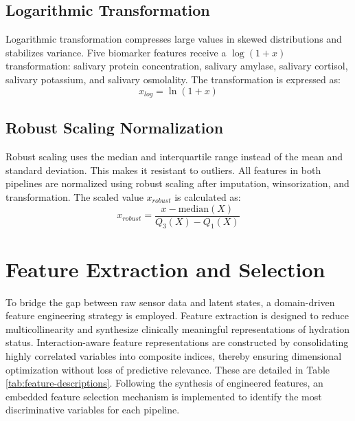\subsection{Logarithmic Transformation}

Logarithmic transformation compresses large values in skewed distributions and stabilizes variance. Five biomarker features receive a $\log(1+x)$ transformation: salivary protein concentration, salivary amylase, salivary cortisol, salivary potassium, and salivary osmolality. The transformation is expressed as:
\begin{equation}
\label{eq:log-transform}
x_{log} = \ln(1 + x)
\end{equation}

\subsection{Robust Scaling Normalization}

Robust scaling uses the median and interquartile range instead of the mean and standard deviation. This makes it resistant to outliers. All features in both pipelines are normalized using robust scaling after imputation, winsorization, and transformation. The scaled value $x_{robust}$ is calculated as:
\begin{equation}
\label{eq:robust-scaling}
x_{robust} = \frac{x - \text{median}(X)}{Q_3(X) - Q_1(X)}
\end{equation}

\section{Feature Extraction and Selection}

To bridge the gap between raw sensor data and latent states, a domain-driven feature engineering strategy is employed. Feature extraction is designed to reduce multicollinearity and synthesize clinically meaningful representations of hydration status. Interaction-aware feature representations are constructed by consolidating highly correlated variables into composite indices, thereby ensuring dimensional optimization without loss of predictive relevance. These are detailed in Table \ref{tab:feature-descriptions}. Following the synthesis of engineered features, an embedded feature selection mechanism is implemented to identify the most discriminative variables for each pipeline.

